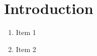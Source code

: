 \chapter*{Introduction}
\lipsum[1-3]
\begin{enumerate}
  \item Item 1
  \item Item 2
\end{enumerate}